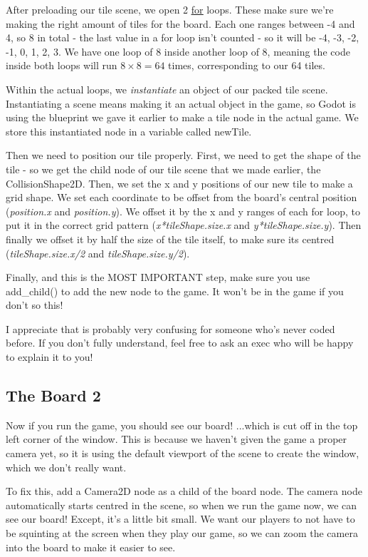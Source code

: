 \documentclass[14pt]{extarticle}
\begin{document}
After preloading our tile scene, we open 2 \href{https://docs.godotengine.org/en/stable/tutorials/scripting/gdscript/gdscript_advanced.html#for-while}{\underline{for}} loops. These make sure we're making the right amount of tiles for the board. Each one ranges between -4 and 4, so 8 in total - the last value in a for loop isn't counted - so it will be -4, -3, -2, -1, 0, 1, 2, 3. We have one loop of 8 inside another loop of 8, meaning the code inside both loops will run $8 \times 8 = 64$ times, corresponding to our 64 tiles.

Within the actual loops, we \textit{instantiate} an object of our packed tile scene. Instantiating a scene means making it an actual object in the game, so Godot is using the blueprint we gave it earlier to make a tile node in the actual game. We store this instantiated node in a variable called newTile.

Then we need to position our tile properly. First, we need to get the shape of the tile - so we get the child node of our tile scene that we made earlier, the CollisionShape2D. Then, we set the x and y positions of our new tile to make a grid shape. We set each coordinate to be offset from the board's central position (\textit{position.x} and \textit{position.y}). We offset it by the x and y ranges of each for loop, to put it in the correct grid pattern (\textit{x*tileShape.size.x} and \textit{y*tileShape.size.y}). Then finally we offset it by half the size of the tile itself, to make sure its centred (\textit{tileShape.size.x/2} and \textit{tileShape.size.y/2}).

Finally, and this is the MOST IMPORTANT step, make sure you use add\_child() to add the new node to the game. It won't be in the game if you don't so this!

I appreciate that is probably very confusing for someone who's never coded before. If you don't fully understand, feel free to ask an exec who will be happy to explain it to you!

\subsection*{The Board 2}
Now if you run the game, you should see our board! ...which is cut off in the top left corner of the window. This is because we haven't given the game a proper camera yet, so it is using the default viewport of the scene to create the window, which we don't really want.

To fix this, add a Camera2D node as a child of the board node. The camera node automatically starts centred in the scene, so when we run the game now, we can see our board! Except, it's a little bit small. We want our players to not have to be squinting at the screen when they play our game, so we can zoom the camera into the board to make it easier to see.
\end{document}
